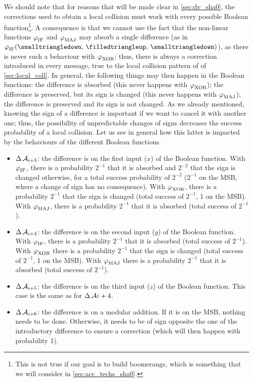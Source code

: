 We should note that for reasons that will be made clear in \autoref{sec:dv_sha0}, the corrections used to obtain a local collision must work with every possible Boolean function\footnote{This is not
true if our goal is to build boomerangs, which is something that we will consider in \autoref{sec:acc_techs_sha0}.}.
A consequence is that we cannot use the fact
that the non-linear functions $\operatorname{\varphi}_\text{IF}$ and $\operatorname{\varphi}_\text{MAJ}$ may absorb a single difference (as in \eg $\boolF_\text{IF}(\text{\nodiffz, \onediffu, \nodiffz})$),
as there is never such a behaviour with $\operatorname{\varphi}_\text{XOR}$; thus, there is always a correction introduced in every message, true to the local collision pattern
of \shiun of \autoref{sec:local_coll}. In general, the following things may then happen in the Boolean functions: the difference is absorbed (this never happens
with $\operatorname{\varphi}_\text{XOR}$);
the difference is preserved, but its sign is changed (this never happens with $\operatorname{\varphi}_\text{MAJ}$); the difference is preserved and its sign is not changed.
As we already mentioned, knowing the sign of a difference is important if we want to cancel it with another one; thus, the possibility of
unpredictable changes of signs decreases the success probability of a local collision.
Let us see in general how this latter is impacted by the behaviours of the different Boolean functions. 
\begin{itemize}
\item $\operatorname{\Delta}\mathcal{A}_{i+3}$: the difference is on the first input ($x$) of the Boolean function. With $\operatorname{\varphi}_\text{IF}$, there is a probability $2^{-1}$ that it is absorbed and $2^{-2}$
that the sign is changed otherwise, for a total success probability of $2^{-2}$ ($2^{-1}$ on the MSB, where a change of sign has no consequence).
With $\operatorname{\varphi}_\text{XOR}$, there is a probability $2^{-1}$ that the sign is changed (total success of $2^{-1}$, 1 on the MSB).
With $\operatorname{\varphi}_\text{MAJ}$, there is a probability $2^{-1}$ that it is absorbed (total success of $2^{-1}$).
\item  $\operatorname{\Delta}\mathcal{A}_{i+4}$: the difference is on the second input ($y$) of the Boolean function. With $\operatorname{\varphi}_\text{IF}$, there is a probability $2^{-1}$ that it is absorbed (total success of $2^{-1}$).
With $\operatorname{\varphi}_\text{XOR}$ there is a probability $2^{-1}$ that the sign is changed (total success of $2^{-1}$, 1 on the MSB). With $\operatorname{\varphi}_\text{MAJ}$ there is a probability $2^{-1}$ that it is absorbed (total success of
$2^{-1}$).
\item $\operatorname{\Delta}\mathcal{A}_{i+5}$: the difference is on the third input ($z$) of the Boolean function. This case is the same as for $\operatorname{\Delta}\mathcal{A}{i+4}$.
\item $\operatorname{\Delta}\mathcal{A}_{i+6}$: the difference is on a modular addition. If it is on the MSB, nothing needs to be done. Otherwise, it needs to be of sign opposite the one of the introductory difference to
ensure a correction (which will then happen with probability 1).
\end{itemize}

